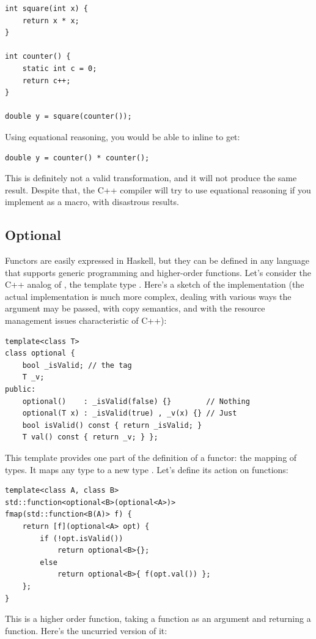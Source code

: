 \begin{Verbatim}[commandchars=\\\{\}]
int square(int x) { 
    return x * x;
}

int counter() { 
    static int c = 0;
    return c++;
}

double y = square(counter());
\end{Verbatim}
Using equational reasoning, you would be able to inline 
to get:

\begin{Verbatim}[commandchars=\\\{\}]
double y = counter() * counter();
\end{Verbatim}
This is definitely not a valid transformation, and it will not produce
the same result. Despite that, the C++ compiler will try to use
equational reasoning if you implement  as a macro, with
disastrous results.

\subsection{Optional}\label{optional}

Functors are easily expressed in Haskell, but they can be defined in any
language that supports generic programming and higher-order functions.
Let's consider the C++ analog of , the template type
. Here's a sketch of the implementation (the actual
implementation is much more complex, dealing with various ways the
argument may be passed, with copy semantics, and with the resource
management issues characteristic of C++):

\begin{Verbatim}[commandchars=\\\{\}]
template<class T>
class optional { 
    bool _isValid; // the tag
    T _v;
public:
    optional()    : _isValid(false) {}        // Nothing
    optional(T x) : _isValid(true) , _v(x) {} // Just
    bool isValid() const { return _isValid; }
    T val() const { return _v; } };
\end{Verbatim}
This template provides one part of the definition of a functor: the
mapping of types. It maps any type  to a new type
. Let's define its action on
functions:

\begin{Verbatim}[commandchars=\\\{\}]
template<class A, class B>
std::function<optional<B>(optional<A>)>
fmap(std::function<B(A)> f) { 
    return [f](optional<A> opt) { 
        if (!opt.isValid()) 
            return optional<B>{};
        else 
            return optional<B>{ f(opt.val()) };
    };
}
\end{Verbatim}
This is a higher order function, taking a function as an argument and
returning a function. Here's the uncurried version of it:


